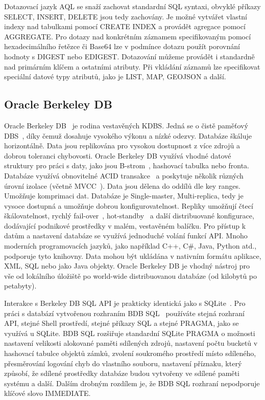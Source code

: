 \documentclass[czech,master,dept460,male,csharp,cpdeclaration]{diploma}
\begin{document}
	Dotazovací jazyk AQL se snaží zachovat standardní SQL syntaxi, obvyklé příkazy SELECT, INSERT, DELETE jsou tedy zachovány. Je možné vytvářet vlastní indexy nad tabulkami pomocí CREATE INDEX a provádět agregace pomocí AGGREGATE. Pro dotazy nad konkrétním záznamem specifikovaným pomocí hexadecimálního řetězce či Base64 lze v podmínce dotazu použít porovnání hodnoty s DIGEST nebo EDIGEST. Dotazování můžeme provádět i standardně nad primárním klíčem a ostatními atributy. Při vkládání záznamů lze specifikovat speciální datové typy atributů, jako je LIST, MAP, GEOJSON a další.
	
	\subsection{Oracle Berkeley DB} \label{lab-oracle-berkleydb}
	
	Oracle Berkeley DB~\cite{berkeleydb} je rodina vestavěných KDBS. Jedná se o čistě paměťový DBS~\cite{inmemory}, díky čemuž dosahuje vysokého výkonu a nízké odezvy. Databáze škáluje horizontálně. Data jsou replikována pro vysokou dostupnost z více zdrojů a dobrou toleranci chybovosti. Oracle Berkeley DB využívá vhodné datové struktury pro práci s daty, jako jsou B-strom~\cite{btree}, hashovací tabulka nebo fronta. Databáze využívá obnovitelné ACID transakce~\cite{acid} a poskytuje několik různých úrovní izolace (včetně MVCC~\cite{mvcc}). Data jsou dělena do oddílů dle key ranges. Umožňuje komprimaci dat. Databáze je Single-master, Multi-replica, tedy je vysoce dostupná a umožňuje dobrou konfigurovatelnost. Repliky umožňují čtecí škálovatelnost, rychlý fail-over~\cite{failover}, hot-standby~\cite{hotstandby} a další distribuované konfigurace, dodávající podnikové prostředky v malém, vestavěném balíčku. Pro přístup k datům a nastavení databáze se využívá jednoduché volání funkcí API. Mnoho moderních programovacích jazyků, jako například C++, C\#, Java, Python atd., podporuje tyto knihovny. Data mohou být ukládána v nativním formátu aplikace, XML, SQL nebo jako Java objekty. Oracle Berkeley DB je vhodný nástroj pro vše od lokálního úložiště po world-wide distribuovanou databáze (od kilobytů po petabyty).
	
	Interakce s Berkeley DB SQL API je prakticky identická jako s SQLite~\cite{sqlite}. Pro práci s databází vytvořenou rozhraním BDB SQL~\cite{bdbsql} používáte stejná rozhraní API, stejné Shell prostředí, stejné příkazy SQL a stejné PRAGMA, jako se využívá u SQLite. BDB SQL rozšiřuje standardní SQLite PRAGMA o možnosti nastavení velikosti alokované paměti sdílených zdrojů, nastavení počtu bucketů v hashovací tabulce objektů zámků, zvolení soukromého prostředí místo sdíleného, přesměrování logování chyb do vlastního souboru, nastavení příznaku, který způsobí, že sdílené prostředky databáze budou vytvořeny ve sdílené paměti systému a další. Dalším drobným rozdílem je, že BDB SQL rozhraní nepodporuje klíčové slovo IMMEDIATE.
	
\end{document}
